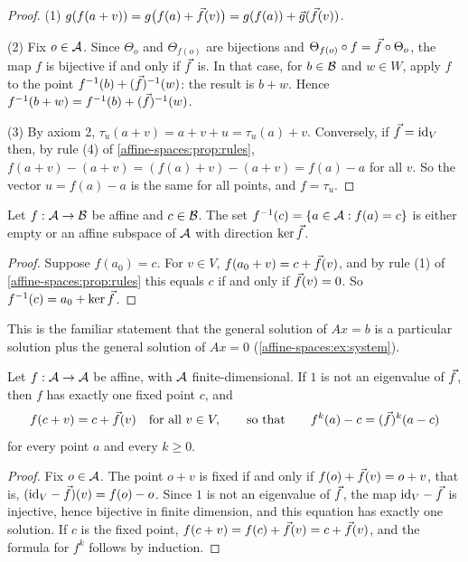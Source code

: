 \begin{notechapter}
\begin{proof}
(1) $g(f(a + v)) = g\bigl(f(a) + \vec{f}(v)\bigr)
= g(f(a)) + \vec{g}(\vec{f}(v))$.

(2) Fix $o\in\mathcal{A}$. Since $\Theta_o$ and $\Theta_{f(o)}$ are bijections and
$\Theta_{f(o)}\circ f = \vec{f}\circ\Theta_o$, the map $f$ is bijective if
and only if $\vec{f}$ is. In that case, for $b\in\mathcal{B}$ and $w\in W$, apply
$f$ to the point $f^{-1}(b) + (\vec{f})^{-1}(w)$: the result is $b + w$.
Hence $f^{-1}(b + w) = f^{-1}(b) + (\vec{f})^{-1}(w)$.

(3) By axiom 2, $\tau_u(a + v) = a + v + u = \tau_u(a) + v$. Conversely, if
$\vec{f} = \mathrm{id}_V$ then, by rule (4) of \cref{affine-spaces:prop:rules},
$f(a + v) - (a + v) = (f(a) + v) - (a + v) = f(a) - a$ for all $v$. So the
vector $u = f(a) - a$ is the same for all points, and $f = \tau_u$.
\end{proof}

\begin{proposition}
\label{affine-spaces:prop:fibre}
Let $f:\mathcal{A}\to\mathcal{B}$ be affine and $c\in\mathcal{B}$. The set
$f^{-1}(c) = \{a\in\mathcal{A} : f(a) = c\}$ is either empty or an affine subspace
of $\mathcal{A}$ with direction $\ker\vec{f}$.
\end{proposition}

\begin{proof}
Suppose $f(a_0) = c$. For $v\in V$, $f(a_0 + v) = c + \vec{f}(v)$, and by
rule (1) of \cref{affine-spaces:prop:rules} this equals $c$ if and only if
$\vec{f}(v) = 0$. So $f^{-1}(c) = a_0 + \ker\vec{f}$.
\end{proof}

This is the familiar statement that the general solution of $Ax = b$ is a
particular solution plus the general solution of $Ax = 0$
(\cref{affine-spaces:ex:system}).

\begin{proposition}\label{affine-spaces:prop:fixed-point}
Let $f:\mathcal{A}\to\mathcal{A}$ be affine, with $\mathcal{A}$ finite-dimensional. If $1$ is
not an eigenvalue of $\vec{f}$, then $f$ has exactly one fixed point $c$,
and
\[
  f(c + v) = c + \vec{f}(v)\quad\text{for all }v\in V,
  \qquad\text{so that}\qquad
  f^k(a) - c = (\vec{f})^k(a - c)
\]
for every point $a$ and every $k\geq0$.
\end{proposition}

\begin{proof}
Fix $o\in\mathcal{A}$. The point $o + v$ is fixed if and only if
$f(o) + \vec{f}(v) = o + v$, that is, $(\mathrm{id}_V - \vec{f})(v) = f(o) - o$. Since
$1$ is not an eigenvalue of $\vec{f}$, the map $\mathrm{id}_V - \vec{f}$ is injective,
hence bijective in finite dimension, and this equation has exactly one
solution. If $c$ is the fixed point, $f(c + v) = f(c) + \vec{f}(v)
= c + \vec{f}(v)$, and the formula for $f^k$ follows by induction.
\end{proof}


\end{notechapter}
